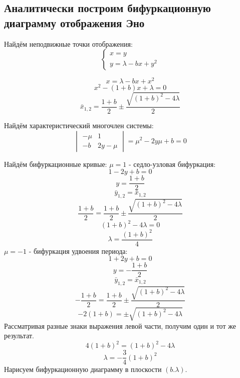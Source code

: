 \documentclass[12pt, a4paper]{article}
\begin{document}
\subsection{Аналитически построим бифуркационную диаграмму отображения Эно}
Найдём неподвижные точки отображения:
\begin{equation*}
	\begin{cases}
		x = y \\
		y = \lambda - bx + y^2
	\end{cases}
\end{equation*}

\[ x = \lambda - bx + x^2 \]
\[ x^2 - (1 + b)x + \lambda = 0 \]
\[ \bar x_{1,2} = \frac{1 + b}{2} \pm \frac{\sqrt{(1 + b)^2 - 4\lambda}}{2} \]

Найдём характеристический многочлен системы:
\begin{equation*}
	\begin{vmatrix}
		-\mu & 1 \\
		-b & 2y  - \mu
	\end{vmatrix}
	= \mu^2 - 2y\mu + b = 0
\end{equation*}

Найдём бифуркационные кривые:
\newline
$\mu = 1$ - седло-узловая бифуркация:
\[ 1 - 2y + b = 0 \]
\[ y = \frac{1 + b}{2} \]
\[ \bar y_{1,2} = \bar x_{1,2} \]
\[ \frac{1 + b}{2} = \frac{1 + b}{2} \pm \frac{\sqrt{(1 + b)^2 - 4\lambda}}{2} \]
\[ (1 + b)^2 - 4\lambda = 0 \]
\[ \lambda = \frac{(1 + b)^2}{4} \]
\newline
$\mu = -1$ - бифуркация удвоения периода:
\[ 1 + 2y + b = 0 \]
\[ y = -\frac{1 + b}{2} \]
\[ \bar y_{1,2} = \bar x_{1,2} \]
\[ -\frac{1 + b}{2} = \frac{1 + b}{2} \pm \frac{\sqrt{(1 + b)^2 - 4\lambda}}{2} \]
\[ -2(1 + b) = \pm \sqrt{(1 + b)^2 - 4\lambda} \]
Рассматривая разные знаки выражения левой части, получим один и тот же результат.
\[ 4(1 + b)^2 = (1 + b)^2 - 4\lambda \]
\[ \lambda = -\frac{3}{4} (1 + b)^2 \]
Нарисуем бифуркационную диаграмму в плоскости $(b. \lambda) $.
\end{document}
